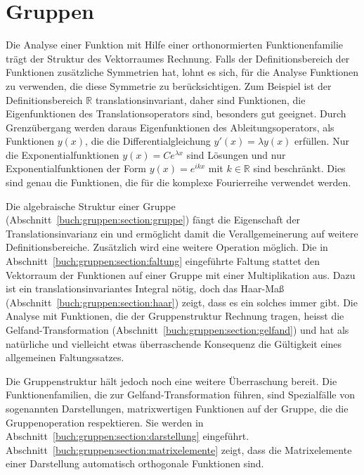 %
%
%
\chapter{Gruppen
\label{buch:chapter:gruppen}}
Die Analyse einer Funktion mit Hilfe einer orthonormierten
Funktionenfamilie trägt der Struktur des Vektorraumes Rechnung.
Falls der Definitionsbereich der Funktionen zusätzliche Symmetrien
hat, lohnt es sich, für die Analyse Funktionen zu verwenden, die
diese Symmetrie zu berücksichtigen.
Zum Beispiel ist der Definitionsbereich $\mathbb{R}$ translationsinvariant,
daher sind Funktionen, die Eigenfunktionen des Translationsoperators
sind, besonders gut geeignet. 
Durch Grenzübergang werden daraus Eigenfunktionen des Ableitungsoperators,
als Funktionen $y(x)$, die die Differentialgleichung $y'(x)=\lambda y(x)$
erfüllen.
Nur die Exponentialfunktionen $y(x)=Ce^{\lambda x}$ sind Lösungen und nur
Exponentialfunktionen der Form $y(x)=e^{ikx}$ mit $k\in\mathbb{R}$
sind beschränkt.
Dies sind genau die Funktionen, die für die komplexe Fourierreihe
verwendet werden.

Die algebraische Struktur einer Gruppe
(Abschnitt~\ref{buch:gruppen:section:gruppe})
fängt die Eigenschaft der Translationsinvarianz ein und ermöglicht
damit die Verallgemeinerung auf weitere Definitionsbereiche.
Zusätzlich wird eine weitere Operation möglich.
Die in Abschnitt~\ref{buch:gruppen:section:faltung} eingeführte
Faltung stattet den Vektorraum der Funktionen auf einer Gruppe
mit einer Multiplikation aus.
Dazu ist ein translationsinvariantes Integral nötig, doch das
Haar-Maß (Abschnitt~\ref{buch:gruppen:section:haar}) zeigt,
dass es ein solches immer gibt.
Die Analyse mit Funktionen, die der Gruppenstruktur Rechnung tragen,
heisst die Gelfand-Transformation
(Abschnitt~\ref{buch:gruppen:section:gelfand})
und hat als natürliche und vielleicht
etwas überraschende Konsequenz die Gültigkeit eines allgemeinen
Faltungssatzes.

Die Gruppenstruktur hält jedoch noch eine weitere Überraschung bereit.
Die Funktionenfamilien, die zur Gelfand-Transformation führen,
sind Spezialfälle von sogenannten Darstellungen, matrixwertigen
Funktionen auf der Gruppe, die die Gruppenoperation respektieren.
Sie werden in Abschnitt~\ref{buch:gruppen:section:darstellung}
eingeführt.
Abschnitt~\ref{buch:gruppen:section:matrixelemente} zeigt, dass
die Matrixelemente einer Darstellung automatisch orthogonale Funktionen
sind.

